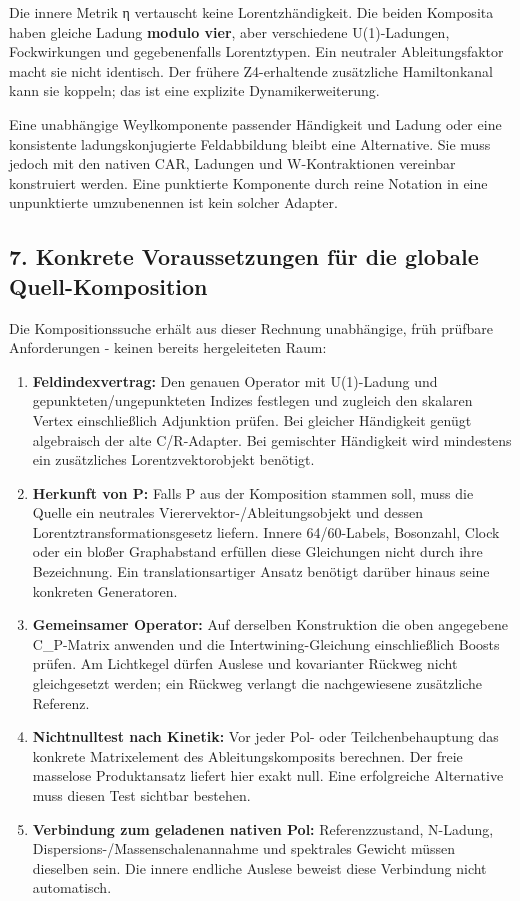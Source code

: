 Die innere Metrik η vertauscht keine Lorentzhändigkeit. Die beiden
Komposita haben gleiche Ladung \textbf{modulo vier}, aber verschiedene
U(1)-Ladungen, Fockwirkungen und gegebenenfalls Lorentztypen. Ein
neutraler Ableitungsfaktor macht sie nicht identisch. Der frühere
Z4-erhaltende zusätzliche Hamiltonkanal kann sie koppeln; das ist eine
explizite Dynamikerweiterung.

Eine unabhängige Weylkomponente passender Händigkeit und Ladung oder
eine konsistente ladungskonjugierte Feldabbildung bleibt eine
Alternative. Sie muss jedoch mit den nativen CAR, Ladungen und
W-Kontraktionen vereinbar konstruiert werden. Eine punktierte Komponente
durch reine Notation in eine unpunktierte umzubenennen ist kein solcher
Adapter.

\subsection{7. Konkrete Voraussetzungen für die globale
Quell-Komposition}\label{konkrete-voraussetzungen-fuxfcr-die-globale-quell-komposition}

Die Kompositionssuche erhält aus dieser Rechnung unabhängige, früh
prüfbare Anforderungen - keinen bereits hergeleiteten Raum:

\begin{enumerate}
\def\labelenumi{\arabic{enumi}.}
\tightlist
\item
  \textbf{Feldindexvertrag:} Den genauen Operator mit U(1)-Ladung und
  gepunkteten/ungepunkteten Indizes festlegen und zugleich den skalaren
  Vertex einschließlich Adjunktion prüfen. Bei gleicher Händigkeit
  genügt algebraisch der alte C/R-Adapter. Bei gemischter Händigkeit
  wird mindestens ein zusätzliches Lorentzvektorobjekt benötigt.
\item
  \textbf{Herkunft von P:} Falls P aus der Komposition stammen soll,
  muss die Quelle ein neutrales Vierervektor-/Ableitungsobjekt und
  dessen Lorentztransformationsgesetz liefern. Innere 64/60-Labels,
  Bosonzahl, Clock oder ein bloßer Graphabstand erfüllen diese
  Gleichungen nicht durch ihre Bezeichnung. Ein translationsartiger
  Ansatz benötigt darüber hinaus seine konkreten Generatoren.
\item
  \textbf{Gemeinsamer Operator:} Auf derselben Konstruktion die oben
  angegebene C\_P-Matrix anwenden und die Intertwining-Gleichung
  einschließlich Boosts prüfen. Am Lichtkegel dürfen Auslese und
  kovarianter Rückweg nicht gleichgesetzt werden; ein Rückweg verlangt
  die nachgewiesene zusätzliche Referenz.
\item
  \textbf{Nichtnulltest nach Kinetik:} Vor jeder Pol- oder
  Teilchenbehauptung das konkrete Matrixelement des Ableitungskomposits
  berechnen. Der freie masselose Produktansatz liefert hier exakt null.
  Eine erfolgreiche Alternative muss diesen Test sichtbar bestehen.
\item
  \textbf{Verbindung zum geladenen nativen Pol:} Referenzzustand,
  N-Ladung, Dispersions-/Massenschalenannahme und spektrales Gewicht
  müssen dieselben sein. Die innere endliche Auslese beweist diese
  Verbindung nicht automatisch.
\end{enumerate}

